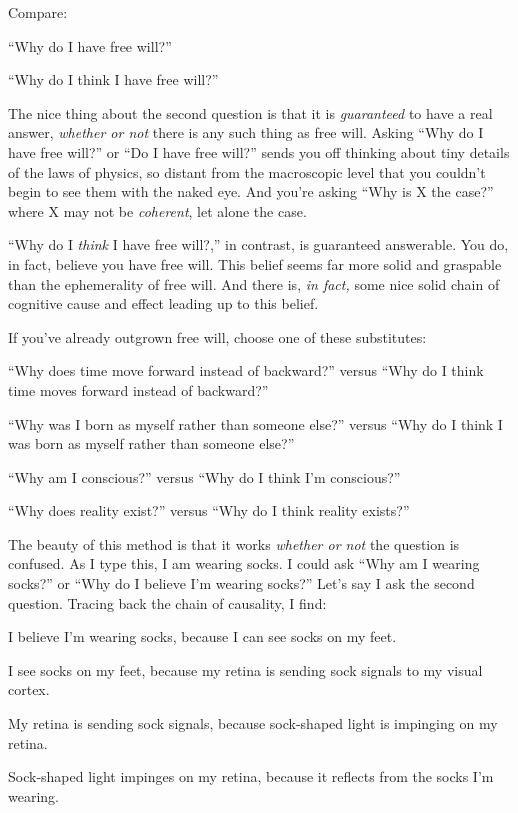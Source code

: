 {
 Compare:}

{
 ``Why do I have free will?''}

{
 ``Why do I think I have free
will?''}

{
 The nice thing about the second question is that it is
\textit{guaranteed} to have a real answer, \textit{whether or not}
there is any such thing as free will. Asking ``Why do
I have free will?'' or ``Do I have
free will?'' sends you off thinking about tiny
details of the laws of physics, so distant from the macroscopic level
that you couldn't begin to see them with the naked eye.
And you're asking ``Why is X the
case?'' where X may not be \textit{coherent}, let
alone the case.}

{
 ``Why do I \textit{think} I have free
will?,'' in contrast, is guaranteed answerable. You
do, in fact, believe you have free will. This belief seems far more
solid and graspable than the ephemerality of free will. And there is,
\textit{in fact,} some nice solid chain of cognitive cause and effect
leading up to this belief.}

{
 If you've already outgrown free will, choose one
of these substitutes:}

{
 ``Why does time move forward instead of
backward?'' versus ``Why do I think
time moves forward instead of backward?''}

{
 ``Why was I born as myself rather than someone
else?'' versus ``Why do I think I
was born as myself rather than someone else?''}

{
 ``Why am I conscious?'' versus
``Why do I think I'm
conscious?''}

{
 ``Why does reality exist?''
versus ``Why do I think reality
exists?''}

{
 The beauty of this method is that it works \textit{whether or not}
the question is confused. As I type this, I am wearing socks. I could
ask ``Why am I wearing socks?'' or
``Why do I believe I'm wearing
socks?'' Let's say I ask the second
question. Tracing back the chain of causality, I find:}

{
 I believe I'm wearing socks, because I can see
socks on my feet.}

{
 I see socks on my feet, because my retina is sending sock signals
to my visual cortex.}

{
 My retina is sending sock signals, because sock-shaped light is
impinging on my retina.}

{
 Sock-shaped light impinges on my retina, because it reflects from
the socks I'm wearing.}

